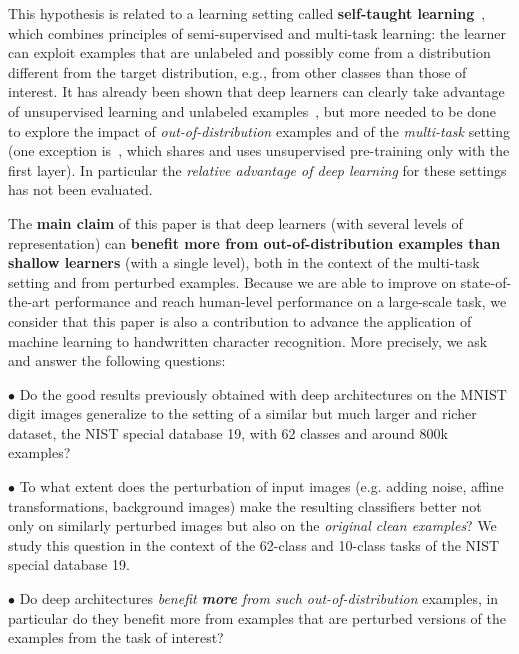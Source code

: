 \documentclass{article} %
\begin{document}
This hypothesis is related to a learning setting called
{\bf self-taught learning}~\citep{RainaR2007}, which combines principles
of semi-supervised and multi-task learning: the learner can exploit examples
that are unlabeled and possibly come from a distribution different from the target
distribution, e.g., from other classes than those of interest. 
It has already been shown that deep learners can clearly take advantage of
unsupervised learning and unlabeled examples~\citep{Bengio-2009,WestonJ2008-small},
but more needed to be done to explore the impact
of {\em out-of-distribution} examples and of the {\em multi-task} setting
(one exception is~\citep{CollobertR2008}, which shares and uses unsupervised
pre-training only with the first layer). In particular the {\em relative
advantage of deep learning} for these settings has not been evaluated.


%
The {\bf main claim} of this paper is that deep learners (with several levels of representation) can
{\bf benefit more from out-of-distribution examples than shallow learners} (with a single
level), both in the context of the multi-task setting and from
 perturbed examples. Because we are able to improve on state-of-the-art
performance and reach human-level performance
on a large-scale task, we consider that this paper is also a contribution
to advance the application of machine learning to handwritten character recognition.
More precisely, we ask and answer the following questions:

$\bullet$ %
Do the good results previously obtained with deep architectures on the
MNIST digit images generalize to the setting of a similar but much larger and richer
dataset, the NIST special database 19, with 62 classes and around 800k examples?

$\bullet$ %
To what extent does the perturbation of input images (e.g. adding
noise, affine transformations, background images) make the resulting
classifiers better not only on similarly perturbed images but also on
the {\em original clean examples}? We study this question in the
context of the 62-class and 10-class tasks of the NIST special database 19.

$\bullet$ %
Do deep architectures {\em benefit {\bf more} from such out-of-distribution}
examples, in particular do they benefit more from 
examples that are perturbed versions of the examples from the task of interest?
\end{document}
